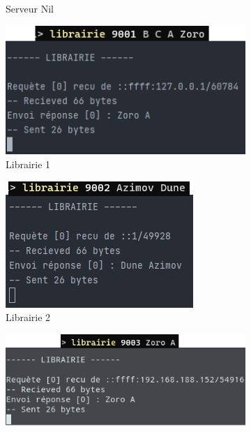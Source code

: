 \documentclass[
  french,
  twocolumn,
	9pt, %
]{fphw}
\begin{document}
\begin{figure}[h]
\begin{subfigure}{.478\textwidth}
    \caption{Serveur Nil}
    \label{fig:nil}
  \end{subfigure}
  \begin{subfigure}{0.245\textwidth}
    \centering
    \includegraphics[width=\textwidth]{librarie1.png}
    \caption{Librairie 1}
    \label{fig:lib1}
  \end{subfigure}
  \begin{subfigure}{0.195\textwidth}
    \centering
    \includegraphics[width=\textwidth]{librarie2.png}
    \caption{Librairie 2}
    \label{fig:lib2}
  \end{subfigure}
  \begin{subfigure}{0.28\textwidth}
    \centering
    \includegraphics[width=\textwidth]{librarie3.png}

\end{subfigure}
\end{figure}
\end{document}
